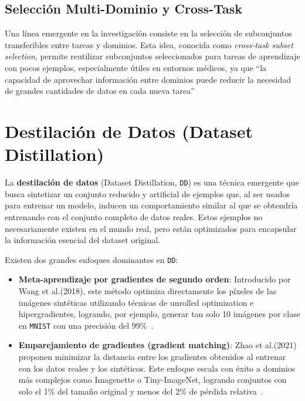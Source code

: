 \subsection{Selección Multi-Dominio y Cross-Task}

Una línea emergente en la investigación consiste en la selección de subconjuntos transferibles entre tareas y dominios.
Esta idea, conocida como \textit{cross‑task subset selection}, permite reutilizar subconjuntos seleccionados para tareas de aprendizaje con pocos ejemplos,
especialmente útiles en entornos médicos,
ya que “la capacidad de aprovechar información entre dominios puede reducir la necesidad de grandes cantidades de datos en cada nueva tarea”~\cite{woernerComprehensiveEasytouseMultidomain2025}


\section{Destilación de Datos (Dataset Distillation)}
La \textbf{destilación de datos} (Dataset Distillation, \texttt{DD}) es una técnica emergente que busca sintetizar un conjunto reducido y artificial de ejemplos que,
al ser usados para entrenar un modelo, inducen un comportamiento similar al que se obtendría entrenando con el conjunto completo de datos reales.
Estos ejemplos no necesariamente existen en el mundo real, pero están optimizados para encapsular la información esencial del dataset original.

Existen dos grandes enfoques dominantes en \texttt{DD}:

\begin{itemize}
      \item \textbf{Meta-aprendizaje por gradientes de segundo orden}: Introducido por Wang et al.(2018),
            este método optimiza directamente los píxeles de las imágenes sintéticas utilizando técnicas de unrolled optimization e hipergradientes,
            logrando, por ejemplo, generar tan solo 10 imágenes por clase en \texttt{MNIST} con una precisión del 99\%~\cite{wangDatasetDistillation2020}.
      \item \textbf{Emparejamiento de gradientes (gradient matching)}: Zhao et al.(2021) proponen minimizar la distancia entre los gradientes obtenidos al entrenar con los datos reales y los sintéticos.
            Este enfoque escala con éxito a dominios más complejos como Imagenette o Tiny-ImageNet,
            logrando conjuntos con solo el 1\% del tamaño original y menos del 2\% de pérdida relativa~\cite{zhaoDatasetCondensationGradient2021}.
\end{itemize}

